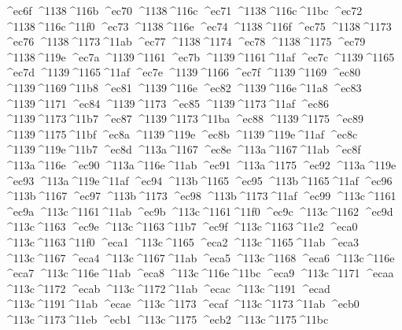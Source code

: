 \checkit ^^^^ec6f ^^^^1138^^^^116b
\checkit ^^^^ec70 ^^^^1138^^^^116c
\checkit ^^^^ec71 ^^^^1138^^^^116c^^^^11bc
\checkit ^^^^ec72 ^^^^1138^^^^116c^^^^11f0
\checkit ^^^^ec73 ^^^^1138^^^^116e
\checkit ^^^^ec74 ^^^^1138^^^^116f
\checkit ^^^^ec75 ^^^^1138^^^^1173
\checkit ^^^^ec76 ^^^^1138^^^^1173^^^^11ab
\checkit ^^^^ec77 ^^^^1138^^^^1174
\checkit ^^^^ec78 ^^^^1138^^^^1175
\checkit ^^^^ec79 ^^^^1138^^^^119e
\checkit ^^^^ec7a ^^^^1139^^^^1161
\checkit ^^^^ec7b ^^^^1139^^^^1161^^^^11af
\checkit ^^^^ec7c ^^^^1139^^^^1165
\checkit ^^^^ec7d ^^^^1139^^^^1165^^^^11af
\checkit ^^^^ec7e ^^^^1139^^^^1166
\checkit ^^^^ec7f ^^^^1139^^^^1169
\checkit ^^^^ec80 ^^^^1139^^^^1169^^^^11b8
\checkit ^^^^ec81 ^^^^1139^^^^116e
\checkit ^^^^ec82 ^^^^1139^^^^116e^^^^11a8
\checkit ^^^^ec83 ^^^^1139^^^^1171
\checkit ^^^^ec84 ^^^^1139^^^^1173
\checkit ^^^^ec85 ^^^^1139^^^^1173^^^^11af
\checkit ^^^^ec86 ^^^^1139^^^^1173^^^^11b7
\checkit ^^^^ec87 ^^^^1139^^^^1173^^^^11ba
\checkit ^^^^ec88 ^^^^1139^^^^1175
\checkit ^^^^ec89 ^^^^1139^^^^1175^^^^11bf
\checkit ^^^^ec8a ^^^^1139^^^^119e
\checkit ^^^^ec8b ^^^^1139^^^^119e^^^^11af
\checkit ^^^^ec8c ^^^^1139^^^^119e^^^^11b7
\checkit ^^^^ec8d ^^^^113a^^^^1167
\checkit ^^^^ec8e ^^^^113a^^^^1167^^^^11ab
\checkit ^^^^ec8f ^^^^113a^^^^116e
\checkit ^^^^ec90 ^^^^113a^^^^116e^^^^11ab
\checkit ^^^^ec91 ^^^^113a^^^^1175
\checkit ^^^^ec92 ^^^^113a^^^^119e
\checkit ^^^^ec93 ^^^^113a^^^^119e^^^^11af
\checkit ^^^^ec94 ^^^^113b^^^^1165
\checkit ^^^^ec95 ^^^^113b^^^^1165^^^^11af
\checkit ^^^^ec96 ^^^^113b^^^^1167
\checkit ^^^^ec97 ^^^^113b^^^^1173
\checkit ^^^^ec98 ^^^^113b^^^^1173^^^^11af
\checkit ^^^^ec99 ^^^^113c^^^^1161
\checkit ^^^^ec9a ^^^^113c^^^^1161^^^^11ab
\checkit ^^^^ec9b ^^^^113c^^^^1161^^^^11f0
\checkit ^^^^ec9c ^^^^113c^^^^1162
\checkit ^^^^ec9d ^^^^113c^^^^1163
\checkit ^^^^ec9e ^^^^113c^^^^1163^^^^11b7
\checkit ^^^^ec9f ^^^^113c^^^^1163^^^^11e2
\checkit ^^^^eca0 ^^^^113c^^^^1163^^^^11f0
\checkit ^^^^eca1 ^^^^113c^^^^1165
\checkit ^^^^eca2 ^^^^113c^^^^1165^^^^11ab
\checkit ^^^^eca3 ^^^^113c^^^^1167
\checkit ^^^^eca4 ^^^^113c^^^^1167^^^^11ab
\checkit ^^^^eca5 ^^^^113c^^^^1168
\checkit ^^^^eca6 ^^^^113c^^^^116e
\checkit ^^^^eca7 ^^^^113c^^^^116e^^^^11ab
\checkit ^^^^eca8 ^^^^113c^^^^116e^^^^11bc
\checkit ^^^^eca9 ^^^^113c^^^^1171
\checkit ^^^^ecaa ^^^^113c^^^^1172
\checkit ^^^^ecab ^^^^113c^^^^1172^^^^11ab
\checkit ^^^^ecac ^^^^113c^^^^1191
\checkit ^^^^ecad ^^^^113c^^^^1191^^^^11ab
\checkit ^^^^ecae ^^^^113c^^^^1173
\checkit ^^^^ecaf ^^^^113c^^^^1173^^^^11ab
\checkit ^^^^ecb0 ^^^^113c^^^^1173^^^^11eb
\checkit ^^^^ecb1 ^^^^113c^^^^1175
\checkit ^^^^ecb2 ^^^^113c^^^^1175^^^^11bc
